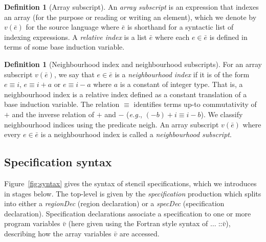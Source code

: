 \documentclass[9pt]{sigplanconf}
\newcounter{block}
\theoremstyle{definition}
\newtheorem{definition}[block]{Definition}
\newcommand{\eg}{\emph{e.g.}}
\newcommand{\nonterm}[1]{\textit{#1}}
\newcommand{\neigh}{\textsf{neigh}}
\begin{document}
\begin{definition}[Array subscript]
  An \emph{array subscript} is an expression that indexes an array
  (for the purpose or reading or writing an element), which we denote
  by $v(\bar{e})$ for the source language where $\bar{e}$ is shorthand
  for a syntactic list of indexing expressions. A \emph{relative
    index} is a list $\bar{e}$ where each $e \in \bar{e}$ is defined
  in terms of some base induction variable.
\end{definition}

\begin{definition}[Neighbourhood index and neighbourhood subscripts]
  For an array subscript $v(\bar{e})$, we say that $e \in \bar{e}$
  is a \emph{neighbourhood index} if it is of the form
  $e \equiv i$, $e \equiv i + a$ or $e \equiv i - a$ where $a$ is a
  constant of integer type. That is, a neighbourhood index is a
  relative index defined as a constant translation of a base induction
  variable. The relation $\equiv$ identifies terms up-to commutativity
  of $+$ and the inverse relation of $+$ and $-$ (\eg{},
  $(-b) + i \equiv i - b$).  We classify neighbourhood indices using
  the predicate \neigh{}. An array subscript $v(\bar{e})$ where every
 $e \in \bar{e}$ is a neighbourhood index is called a
 \emph{neighbourhood subscript}.
\end{definition}


\subsection{Specification syntax}
\label{sec:syntax}

Figure~\ref{fig:syntax} gives the syntax of stencil specifications,
which we introduces in stages below.  The top-level is given by the
\nonterm{specification} production which splits into either a
\nonterm{regionDec} (region declaration) or a \nonterm{specDec}
(specification declaration). Specification declarations associate a
specification to one or more program variables $\bar{v}$ (here given
using the Fortran style syntax of $\ldots \; \texttt{::} \bar{v}$),
describing how the array variables $\bar{v}$ are accessed.

\end{document}
